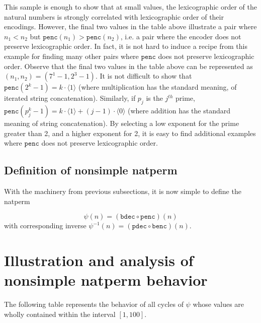 \documentclass[12pt,reqno]{article}
\begin{document}
This sample is enough to show that at small values, the lexicographic order of the natural numbers is strongly correlated with lexicographic order of their encodings. However, the final two values in the table above illustrate a pair where $n_1 < n_2$ but $\texttt{penc}(n_1) > \texttt{penc}(n_2)$, i.e. a pair where the encoder does not preserve lexicographic order. In fact, it is not hard to induce a recipe from this example for finding many other pairs where $\texttt{penc}$ does not preserve lexicographic order. Observe that the final two values in the table above can be represented as $(n_1, n_2) = (7^1 - 1, 2^3 - 1)$. It is not difficult to show that $\texttt{penc}(2^k - 1) = k \cdot \langle 1 \rangle$ (where multiplication has the standard meaning, of iterated string concatenation). Similarly, if $p_j$ is the $j^{th}$ prime, $\texttt{penc}(p_j^k - 1) = k \cdot \langle 1 \rangle + (j - 1) \cdot \langle 0 \rangle$ (where addition has the standard meaning of string concatenation). By selecting a low exponent for the prime greater than 2, and a higher exponent for 2, it is easy to find additional examples where $\texttt{penc}$ does not preserve lexicographic order.

\subsection{Definition of nonsimple natperm}

With the machinery from previous subsections, it is now simple to define the natperm

\begin{equation}
    \psi(n) = ( \texttt{bdec} \circ \texttt{penc} ) (n)
\end{equation}
with corresponding inverse $\psi^{-1}(n) = ( \texttt{pdec}  \circ \texttt{benc} ) (n)$.

\section{Illustration and analysis of nonsimple natperm behavior}

The following table represents the behavior of all cycles of $\psi$ whose values are wholly contained within the interval $ [ 1, 100 ] $. 
\end{document}
